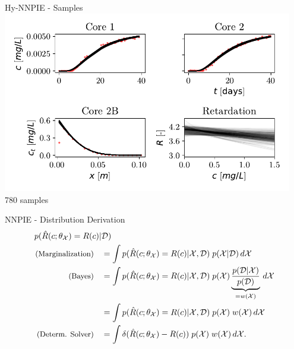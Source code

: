 \documentclass[aspectratio=1610]{beamer}
\begin{document}
\begin{frame}{Hy-NNPIE - Samples}
\centering
\includegraphics[width=0.95\textwidth]{figs/finn_span_samples.pdf}
780 samples
\end{frame}

\begin{frame}{NNPIE - Distribution Derivation}
\begin{align*}
p(\hat{R}(c;\theta_{\mathcal{X}}) = R(c)| &\mathcal{D}) \\
\small{\text{(Marginalization)}} \quad &= \int p(\hat{R}(c;\theta_{\mathcal{X}}) = R(c) | \mathcal{X}, \mathcal{D})\; p(\mathcal{X} | \mathcal{D}) \, d\mathcal{X} \\
                                         \small{\text{(Bayes)}} \quad &= \int p(\hat{R}(c;\theta_{\mathcal{X}}) = R(c) | \mathcal{X}, \mathcal{D})\; p(\mathcal{X}) \underbrace{\frac{p(\mathcal{D} | \mathcal{X}) }{p(\mathcal{D})}}_{= w(\mathcal{X})} \, d\mathcal{X} \\
                                          &= \int p(\hat{R}(c;\theta_{\mathcal{X}}) = R(c) | \mathcal{X}, \mathcal{D})\; p(\mathcal{X})\; w(\mathcal{X}) \, d\mathcal{X} \\
                                         \small{\text{(Determ. Solver)}} \quad &= \int \delta(\hat{R}(c;\theta_{\mathcal{X}}) - R(c))\; p(\mathcal{X})\; w(\mathcal{X}) \, d\mathcal{X} .
\end{align*}
\end{frame}
\end{document}
